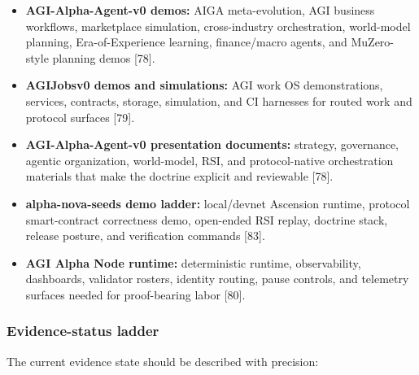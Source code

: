 \documentclass[
  11pt,
]{article}
\providecommand{\tightlist}{%
  \setlength{\itemsep}{0pt}\setlength{\parskip}{0pt}}
\begin{document}
\begin{itemize}
\tightlist
\item
  \textbf{AGI-Alpha-Agent-v0 demos:} AIGA meta-evolution, AGI business
  workflows, marketplace simulation, cross-industry orchestration,
  world-model planning, Era-of-Experience learning, finance/macro
  agents, and MuZero-style planning demos {[}78{]}.
\item
  \textbf{AGIJobsv0 demos and simulations:} AGI work OS demonstrations,
  services, contracts, storage, simulation, and CI harnesses for routed
  work and protocol surfaces {[}79{]}.
\item
  \textbf{AGI-Alpha-Agent-v0 presentation documents:} strategy,
  governance, agentic organization, world-model, RSI, and
  protocol-native orchestration materials that make the doctrine
  explicit and reviewable {[}78{]}.
\item
  \textbf{alpha-nova-seeds demo ladder:} local/devnet Ascension runtime,
  protocol smart-contract correctness demo, open-ended RSI replay,
  doctrine stack, release posture, and verification commands {[}83{]}.
\item
  \textbf{AGI Alpha Node runtime:} deterministic runtime, observability,
  dashboards, validator rosters, identity routing, pause controls, and
  telemetry surfaces needed for proof-bearing labor {[}80{]}.
\end{itemize}

\subsubsection{Evidence-status ladder}\label{evidence-status-ladder}

The current evidence state should be described with precision:
\end{document}

